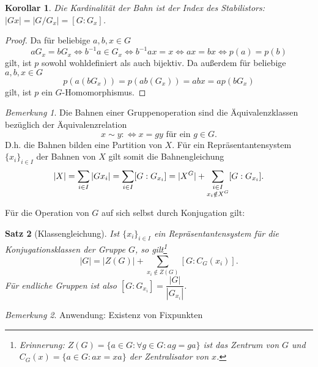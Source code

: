 \documentclass[12pt]{scrartcl} %
\newtheorem{thm}{Satz}[section]
\newtheorem{kor}[thm]{Korollar}
\theoremstyle{definition}
\theoremstyle{remark}
\newtheorem*{nb}{Bemerkung}
\begin{document}
\begin{kor}
	Die Kardinalität der Bahn ist der Index des Stabilistors: $|Gx|=|G/G_x|=[G:G_x]$.
\end{kor}
	
\begin{proof}
	Da für beliebige \(a,b,x \in G\)
	$$aG_x=bG_x \Leftrightarrow b^{-1}a \in G_x \Leftrightarrow b^{-1}ax=x \Leftrightarrow ax=bx \Leftrightarrow p(a)=p(b)$$
	gilt, ist $p$ sowohl wohldefiniert als auch bijektiv.
	Da außerdem für beliebige \(a,b,x \in G\)
	$$p(a(bG_x))=p(ab(G_x))=abx=ap(bG_x)$$
	gilt, ist $p$ ein $G$-Homomorphismus.
\end{proof}

\begin{nb}
	Die Bahnen einer Gruppenoperation sind die Äquivalenzklassen bezüglich der Äquivalenzrelation
	\[x \sim y :\Leftrightarrow \text{\(x=gy\) für ein \(g\in G\).}\]
	D.h. die Bahnen bilden eine Partition von $X$.
	Für ein Repräsentantensystem $\{x_i\}_{i\in I}$ der Bahnen von \(X\) gilt somit die Bahnengleichung
	$$ |X| =\sum\limits_{\begin{subarray}{1}i \in I\end{subarray}}|Gx_i| =\sum\limits_{\begin{subarray}{1}i \in I\end{subarray}}[G:G_{x_i}] =|X^G|+\sum\limits_{\begin{subarray}{c}i \in I\\ x_i \notin X^G\end{subarray}}[G:G_{x_i}]. $$
\end{nb}

Für die Operation von \(G\) auf sich selbst durch Konjugation gilt:
\begin{thm} [Klassengleichung]
	Ist $\{x_{i}\}_{i \in I}$ ein Repräsentantensystem für die Konjugationsklassen der Gruppe \(G\), so gilt\footnote{Erinnerung: \(Z(G)=\{a \in G : \forall g \in G: ag=ga\}\) ist das Zentrum von \(G\) und \(C_G(x) = \{a \in G :ax = xa\}\) der Zentralisator von \(x\).}
	\[|G|= |Z(G)|+\sum_{x_{i}\notin Z(G)}[G:C_{G}(x_{i})].\]
        Für endliche Gruppen ist also $[G:G_{x_{i}}]=\dfrac{|G|}{|G_{x_{i}}|}$. %
\end{thm}

\begin{nb}
	Anwendung: Existenz von Fixpunkten
\end{nb}
\end{document}

